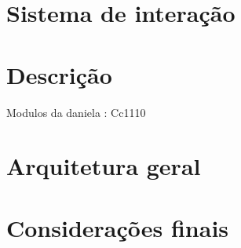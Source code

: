 \section{Sistema de interação}


\section{Descrição}


Modulos da daniela : Cc1110



\section{Arquitetura geral}




\newpage












\section{Considerações finais}